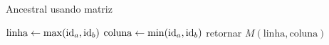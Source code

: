 \begin{algorithm}
	\caption{Ancestral usando matriz}
	\label{alg:matriz}
	\newcommand \linha {\mathrm{linha}}
	\newcommand \coluna {\mathrm{coluna}}
	\begin{algorithmic}
			\State $\linha  \gets \max(\id{a}, \id{b})$
			\State $\coluna \gets \min(\id{a}, \id{b})$
			\State retornar $M(\linha, \coluna)$
		\EndFunction
	\end{algorithmic}
\end{algorithm}
